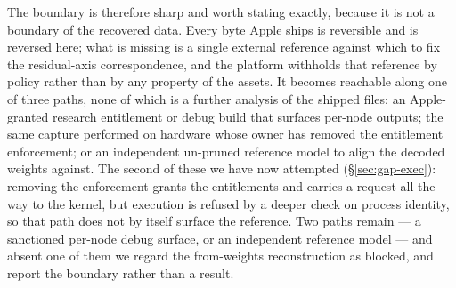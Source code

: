 The boundary is therefore sharp and worth stating exactly, because it is not a boundary of the
recovered data. Every byte Apple ships is reversible and is reversed here; what is missing is a
single external reference against which to fix the residual-axis correspondence, and the platform
withholds that reference by policy rather than by any property of the assets. It becomes reachable
along one of three paths, none of which is a further analysis of the shipped files: an
Apple-granted research entitlement or debug build that surfaces per-node outputs; the same capture
performed on hardware whose owner has removed the entitlement enforcement; or an independent
un-pruned reference model to align the decoded weights against. The second of these we have now
attempted (\S\ref{sec:gap-exec}): removing the enforcement grants the entitlements and carries a
request all the way to the kernel, but execution is refused by a deeper check on process identity,
so that path does not by itself surface the reference. Two paths remain --- a sanctioned per-node
debug surface, or an independent reference model --- and absent one of them we regard the
from-weights reconstruction as blocked, and report the boundary rather than a result.
